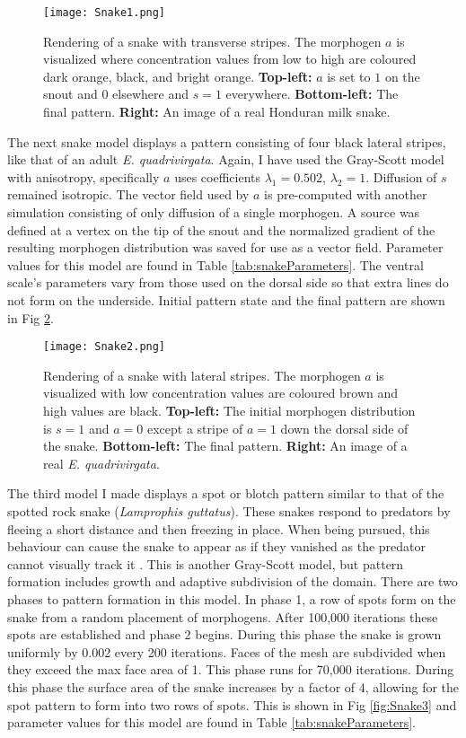 \begin{figure}[ht]
	\centering
	\texttt{[image: Snake1.png]}
	\caption{Rendering of a snake with transverse stripes. The morphogen $a$ is visualized where concentration values from low to high are coloured dark orange, black, and bright orange. \textbf{Top-left:} $a$ is set to $1$ on the snout and $0$ elsewhere and $s=1$ everywhere. \textbf{Bottom-left:} The final pattern. \textbf{Right:} An image of a real Honduran milk snake.}
	\label{fig:Snake1}
\end{figure}

The next snake model displays a pattern consisting of four black lateral stripes, like that of an adult \textit{E. quadrivirgata}. Again, I have used the Gray-Scott model with anisotropy, specifically $a$ uses coefficients $\lambda_{1}=0.502$, $\lambda_{2}=1$. Diffusion of $s$ remained isotropic. The vector field used by $a$ is pre-computed with another simulation consisting of only diffusion of a single morphogen. A source was defined at a vertex on the tip of the snout and the normalized gradient of the resulting morphogen distribution was saved for use as a vector field. Parameter values for this model are found in Table \ref{tab:snakeParameters}. The ventral scale's parameters vary from those used on the dorsal side so that extra lines do not form on the underside. Initial pattern state and the final pattern are shown in Fig \ref{fig:Snake2}.

\begin{figure}[ht]
	\centering
	\texttt{[image: Snake2.png]}
	\caption{Rendering of a snake with lateral stripes. The morphogen $a$ is visualized with low concentration values are coloured brown and high values are black. \textbf{Top-left:} The initial morphogen distribution is $s=1$ and $a=0$ except a stripe of $a=1$ down the dorsal side of the snake. \textbf{Bottom-left:} The final pattern. \textbf{Right:} An image of a real \textit{E. quadrivirgata}.}
	\label{fig:Snake2}
\end{figure}

The third model I made displays a spot or blotch pattern similar to that of the spotted rock snake (\textit{Lamprophis guttatus}). These snakes respond to predators by fleeing a short distance and then freezing in place. When being pursued, this behaviour can cause the snake to appear as if they vanished as the predator cannot visually track it \citet{lillywhite2014}. This is another Gray-Scott model, but pattern formation includes growth and adaptive subdivision of the domain. There are two phases to pattern formation in this model. In phase 1, a row of spots form on the snake from a random placement of morphogens. After 100,000 iterations these spots are established and phase 2 begins. During this phase the snake is grown uniformly by 0.002 every 200 iterations. Faces of the mesh are subdivided when they exceed the max face area of 1. This phase runs for 70,000 iterations. During this phase the surface area of the snake increases by a factor of 4, allowing for the spot pattern to form into two rows of spots. This is shown in Fig \ref{fig:Snake3} and parameter values for this model are found in Table \ref{tab:snakeParameters}.

